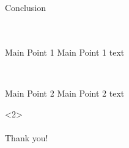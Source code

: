 \documentclass[beamer,aspectratio=169,12pt]{standalone}
\begin{document}


\begin{frame}{Conclusion}
\ \\
\ \\
\ \\

\begin{block}{Main Point 1}
Main Point 1 text
\end{block}

\ \\

\begin{block}{Main Point 2}
Main Point 2 text
\end{block}

\begin{block}<2>{}
\ \\
\ \\
\centering
Thank you!
\end{block}

\end{frame}



\end{document}
